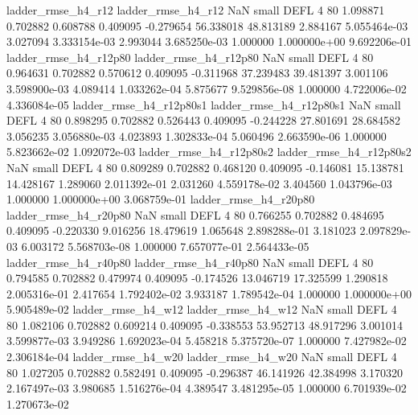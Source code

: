       ladder_rmse_h4_r12       ladder_rmse_h4_r12                   NaN      small     DEFL                 4 80 1.098871       0.702882 0.608788       0.409095   -0.279654     56.338018     48.813189     2.884167   5.055464e-03  3.027094 3.333154e-03     2.993044   3.685250e-03            1.000000    1.000000e+00        9.692206e-01
   ladder_rmse_h4_r12p80    ladder_rmse_h4_r12p80                   NaN      small     DEFL                 4 80 0.964631       0.702882 0.570612       0.409095   -0.311968     37.239483     39.481397     3.001106   3.598900e-03  4.089414 1.033262e-04     5.875677   9.529856e-08            1.000000    4.722006e-02        4.336084e-05
 ladder_rmse_h4_r12p80s1  ladder_rmse_h4_r12p80s1                   NaN      small     DEFL                 4 80 0.898295       0.702882 0.526443       0.409095   -0.244228     27.801691     28.684582     3.056235   3.056880e-03  4.023893 1.302833e-04     5.060496   2.663590e-06            1.000000    5.823662e-02        1.092072e-03
 ladder_rmse_h4_r12p80s2  ladder_rmse_h4_r12p80s2                   NaN      small     DEFL                 4 80 0.809289       0.702882 0.468120       0.409095   -0.146081     15.138781     14.428167     1.289060   2.011392e-01  2.031260 4.559178e-02     3.404560   1.043796e-03            1.000000    1.000000e+00        3.068759e-01
   ladder_rmse_h4_r20p80    ladder_rmse_h4_r20p80                   NaN      small     DEFL                 4 80 0.766255       0.702882 0.484695       0.409095   -0.220330      9.016256     18.479619     1.065648   2.898288e-01  3.181023 2.097829e-03     6.003172   5.568703e-08            1.000000    7.657077e-01        2.564433e-05
   ladder_rmse_h4_r40p80    ladder_rmse_h4_r40p80                   NaN      small     DEFL                 4 80 0.794585       0.702882 0.479974       0.409095   -0.174526     13.046719     17.325599     1.290818   2.005316e-01  2.417654 1.792402e-02     3.933187   1.789542e-04            1.000000    1.000000e+00        5.905489e-02
      ladder_rmse_h4_w12       ladder_rmse_h4_w12                   NaN      small     DEFL                 4 80 1.082106       0.702882 0.609214       0.409095   -0.338553     53.952713     48.917296     3.001014   3.599877e-03  3.949286 1.692023e-04     5.458218   5.375720e-07            1.000000    7.427982e-02        2.306184e-04
      ladder_rmse_h4_w20       ladder_rmse_h4_w20                   NaN      small     DEFL                 4 80 1.027205       0.702882 0.582491       0.409095   -0.296387     46.141926     42.384998     3.170320   2.167497e-03  3.980685 1.516276e-04     4.389547   3.481295e-05            1.000000    6.701939e-02        1.270673e-02
